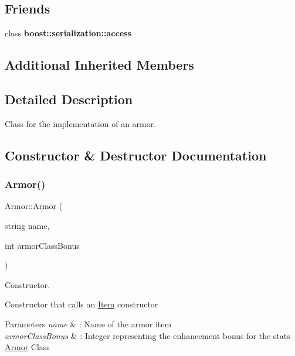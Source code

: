 \subsection*{Friends}
\begin{DoxyCompactItemize}
\item 
\hypertarget{class_armor_ac98d07dd8f7b70e16ccb9a01abf56b9c}{}\label{class_armor_ac98d07dd8f7b70e16ccb9a01abf56b9c} 
class {\bfseries boost\+::serialization\+::access}
\end{DoxyCompactItemize}
\subsection*{Additional Inherited Members}


\subsection{Detailed Description}
Class for the implementation of an armor. 

\subsection{Constructor \& Destructor Documentation}
\hypertarget{class_armor_a64d656ec063fbefab565d1115f725a93}{}\label{class_armor_a64d656ec063fbefab565d1115f725a93} 
\subsubsection{\texorpdfstring{Armor()}{Armor()}\hspace{0.1cm}{\footnotesize\ttfamily [1/2]}}
{\footnotesize\ttfamily Armor\+::\+Armor (\begin{DoxyParamCaption}\item[{string}]{name,  }\item[{int}]{armor\+Class\+Bonus }\end{DoxyParamCaption})}



Constructor. 

Constructor that calls an \hyperlink{class_item}{Item} constructor 
\begin{DoxyParams}{Parameters}
{\em name} & \+: Name of the armor item \\
\hline
{\em armor\+Class\+Bonus} & \+: Integer representing the enhancement bonus for the stats \hyperlink{class_armor}{Armor} Class \\
\hline
\end{DoxyParams}
\hypertarget{class_armor_a2911c5c6132e32d6de2693ffffb8fc76}{}\label{class_armor_a2911c5c6132e32d6de2693ffffb8fc76} 
